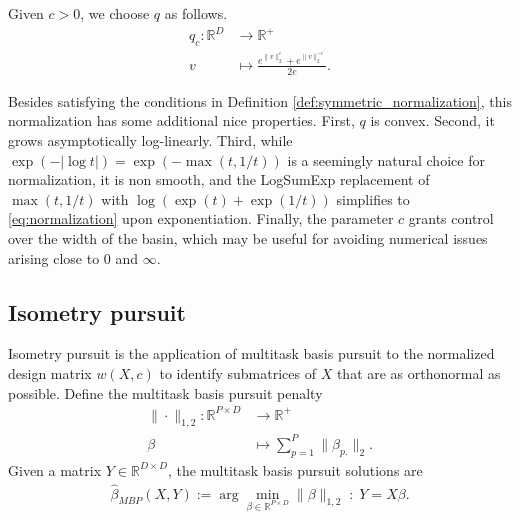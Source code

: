 Given $c > 0$, we choose $q$ as follows.
\begin{align}
q_c: \mathbb R^D  &\to \mathbb R^+ \\
v  &\mapsto \frac{e^{\|v\|_2^c} + e^{\|v\|_2^{-c}}}{2e}.
\label{eq:normalization}
\end{align}

Besides satisfying the conditions in Definition \ref{def:symmetric_normalization}, this normalization has some additional nice properties.
First, $q$ is convex.
Second, it grows asymptotically log-linearly.
Third, while $\exp(-|\log t|) = \exp(-\max (t, 1/t))$ is a seemingly natural choice for normalization, it is non smooth, and the LogSumExp \citep{Boyd2004-ql} replacement of $\max (t, 1/t)$ with $ \log (\exp (t ) + \exp(1/t))$ simplifies to \ref{eq:normalization} upon exponentiation.
Finally, the parameter $c$ grants control over the width of the basin, which may be useful for avoiding numerical issues arising close to $0$ and $\infty$.




\subsection{Isometry pursuit}

Isometry pursuit is the application of multitask basis pursuit to the normalized design matrix $w(X, c)$ to identify submatrices of $ X$ that are as orthonormal as possible.
Define the multitask basis pursuit penalty 
\begin{align}
\label{eq:bp}
\| \cdot \|_{1,2}: \mathbb R^{P \times D} &\to \mathbb R^+ \\ 
\beta &\mapsto  \sum_{p=1}^P  \|\beta_{p.}\|_2.
\end{align}
Given a matrix $Y \in \mathbb R^{D \times D}$, the multitask basis pursuit solutions are
\begin{align}
\label{prog:multitask_basis_pursuit}
\widehat {\mathcal {\beta}}_{MBP} (X, Y)  := \arg \min_{\beta \in \mathbb R^{P \times D}} \| \beta \|_{1,2} \; : \;Y =  X \beta.
\end{align}

